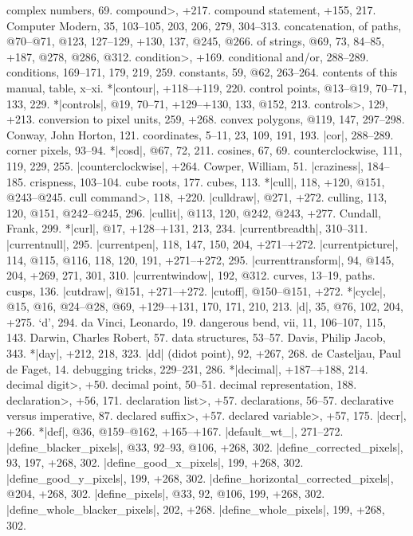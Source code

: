 complex numbers, 69.
\<compound>, +217.
compound statement, +155, 217.
Computer Modern, 35, 103--105, 203, 206, 279, 304--313.
concatenation, of paths, @70--@71, @123, 127--129, +130, 137, @245, @266.
\sub of strings, @69, 73, 84--85, +187, @278, @286, @312.
\<condition>, +169.
conditional and/or, 288--289.
conditions, 169--171, 179, 219, 259.
constants, 59, @62, 263--264.
contents of this manual, table, x--xi.
*|contour|, +118--+119, 220.
control points, @13--@19, 70--71, 133, 229.
*|controls|, @19, 70--71, +129--+130, 133, @152, 213.
\<controls>, 129, +213.
conversion to pixel units, 259, +268.
convex polygons, @119, 147, 297--298.
Conway, John Horton, 121.
coordinates, 5--11, 23, 109, 191, 193.
|cor|, 288--289.
corner pixels, 93--94.
*|cosd|, @67, 72, 211.
cosines, 67, 69.
counterclockwise, 111, 119, 229, 255.
|counterclockwise|, +264.
Cowper, William, 51.
|craziness|, 184--185.
crispness, 103--104.
cube roots, 177.
cubes, 113.
*|cull|, 118, +120, @151, @243--@245.
\<cull command>, 118, +220.
|culldraw|, @271, +272.
culling, 113, 120, @151, @242--@245, 296.
|cullit|, @113, 120, @242, @243, +277.
Cundall, Frank, 299.
*|curl|, @17, +128--+131, 213, 234.
|currentbreadth|, 310--311.
|currentnull|, 295.
|currentpen|, 118, 147, 150, 204, +271--+272.
|currentpicture|, 114, @115, @116, 118, 120, 191, +271--+272, 295.
|currenttransform|, 94, @145, 204, +269, 271, 301, 310.
|currentwindow|, 192, @312.
curves, 13--19, \see paths.
cusps, 136.
|cutdraw|, @151, +271--+272.
|cutoff|, @150--@151, +272.
*|cycle|, @15, @16, @24--@28, @69, +129--+131, 170, 171, 210, 213.
\newletter
|d|, 35, @76, 102, 204, +275.
`d', 294.
da Vinci, Leonardo, 19.
dangerous bend, vii, 11, 106--107, 115, 143.
Darwin, Charles Robert, 57.
data structures, 53--57.
Davis, Philip Jacob, 343.
*|day|, +212, 218, 323.
|dd| (didot point), 92, +267, 268.
de Casteljau, Paul de Faget, 14.
debugging tricks, 229--231, 286.
*|decimal|, +187--+188, 214.
\<decimal digit>, +50.
decimal point, 50--51.
decimal representation, 188.
\<declaration>, +56, 171.
\<declaration list>, +57.
declarations, 56--57.
declarative versus imperative, 87.
\<declared suffix>, +57.
\<declared variable>, +57, 175.
|decr|, +266.
*|def|, @36, @159--@162, +165--+167.
|default_wt_|, 271--272.
|define_blacker_pixels|, @33, 92--93, @106, +268, 302.
|define_corrected_pixels|, 93, 197, +268, 302.
|define_good_x_pixels|, 199, +268, 302.
|define_good_y_pixels|, 199, +268, 302.
|define_horizontal_corrected_pixels|, @204, +268, 302.
|define_pixels|, @33, 92, @106, 199, +268, 302.
|define_whole_blacker_pixels|, 202, +268.
|define_whole_pixels|, 199, +268, 302.
